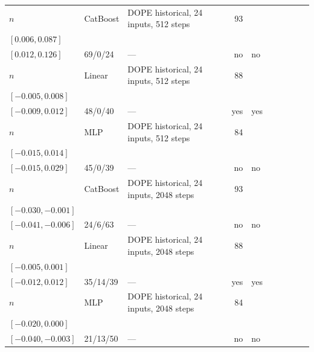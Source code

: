 \begin{longtable}{@{}ll>{\raggedright\arraybackslash}p{1.1in}rllrlll@{}}
$n$ & CatBoost & DOPE historical, 24 inputs, 512 steps & 93 & \begin{tabular}[t]{@{}l@{}}$0.032$\\\tiny$[0.006, 0.087]$\end{tabular} & \begin{tabular}[t]{@{}l@{}}$0.053$\\\tiny$[0.012, 0.126]$\end{tabular} & 69/0/24 & --- & no & no \\
$n$ & Linear & DOPE historical, 24 inputs, 512 steps & 88 & \begin{tabular}[t]{@{}l@{}}$0.003$\\\tiny$[-0.005, 0.008]$\end{tabular} & \begin{tabular}[t]{@{}l@{}}$0.003$\\\tiny$[-0.009, 0.012]$\end{tabular} & 48/0/40 & --- & yes & yes \\
$n$ & MLP & DOPE historical, 24 inputs, 512 steps & 84 & \begin{tabular}[t]{@{}l@{}}$0.002$\\\tiny$[-0.015, 0.014]$\end{tabular} & \begin{tabular}[t]{@{}l@{}}$0.010$\\\tiny$[-0.015, 0.029]$\end{tabular} & 45/0/39 & --- & no & no \\
$n$ & CatBoost & DOPE historical, 24 inputs, 2048 steps & 93 & \begin{tabular}[t]{@{}l@{}}$-0.013$\\\tiny$[-0.030, -0.001]$\end{tabular} & \begin{tabular}[t]{@{}l@{}}$-0.019$\\\tiny$[-0.041, -0.006]$\end{tabular} & 24/6/63 & --- & no & no \\
$n$ & Linear & DOPE historical, 24 inputs, 2048 steps & 88 & \begin{tabular}[t]{@{}l@{}}$0.000$\\\tiny$[-0.005, 0.001]$\end{tabular} & \begin{tabular}[t]{@{}l@{}}$0.000$\\\tiny$[-0.012, 0.012]$\end{tabular} & 35/14/39 & --- & yes & yes \\
$n$ & MLP & DOPE historical, 24 inputs, 2048 steps & 84 & \begin{tabular}[t]{@{}l@{}}$-0.005$\\\tiny$[-0.020, 0.000]$\end{tabular} & \begin{tabular}[t]{@{}l@{}}$-0.014$\\\tiny$[-0.040, -0.003]$\end{tabular} & 21/13/50 & --- & no & no \\

\end{longtable}
